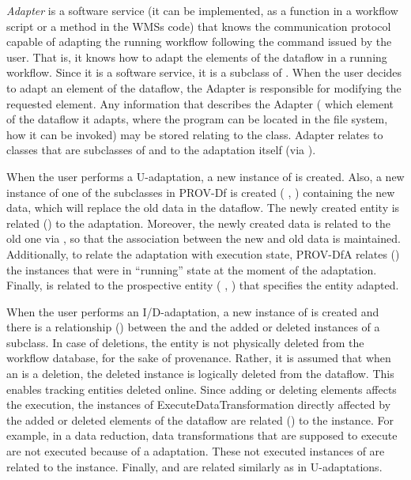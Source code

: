\textit{Adapter} is a software service (it can be implemented, \eg{} as a function in a workflow script or a method in the WMSs code)
that knows the communication protocol
capable of adapting the running workflow following the command issued by the user. That is, it knows how to adapt the elements of the
dataflow in a running workflow. Since it is a software service,
it is a subclass of .
When the user decides to adapt an element of the dataflow, the Adapter
is responsible for modifying the requested element.
Any information that describes the Adapter (\eg{}
which element of the dataflow it adapts,
where the program can be located in the file system,
how it can be invoked) may be stored relating to the  class.
Adapter relates to classes that are subclasses of  and to the
adaptation itself (via ).

When the user performs a U-adaptation, a new instance of  is created.
Also, a new instance of one of the  subclasses in PROV-Df is created
(\eg{} , ) containing the new data,
which will replace the old data in the dataflow.
The newly created entity is related () to the adaptation.
Moreover, the newly created data is related to the old one via
, so that the association between the new and old data is maintained.
Additionally, to relate the adaptation with execution state, PROV-DfA relates
() the
 instances that were in ``running''
state at the moment of the adaptation.
Finally,  is related to the prospective entity (\eg{} , )
that specifies the entity adapted.

When the user performs an I/D-adaptation, a new instance of  is created and there is a relationship () between the  and the added or deleted instances of a  subclass.
In case of deletions, the entity is not physically deleted from the workflow database,
for the sake of provenance.
Rather, it is assumed that when an  is a deletion,
the deleted instance is logically deleted from the dataflow. This enables tracking entities deleted online. Since adding or deleting elements affects the execution, the instances of ExecuteDataTransformation directly affected by the added or deleted elements of the dataflow are related () to the  instance.
For example, in a data reduction, data transformations that are supposed to execute are not executed because of a adaptation.
These not executed instances of  are related to the  instance. Finally,  and  are related similarly as in U-adaptations.

